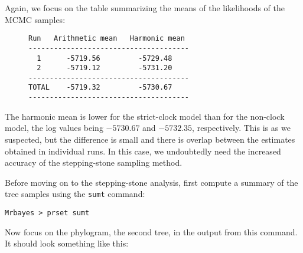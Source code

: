 \documentclass[12pt]{book}
\begin{document}
Again, we focus on the table summarizing the means of the likelihoods of the MCMC samples:

\begin{figure}[h]
\centering
\begin{BVerbatim}
Run   Arithmetic mean   Harmonic mean
--------------------------------------
  1      -5719.56         -5729.48
  2      -5719.12         -5731.20
--------------------------------------
TOTAL    -5719.32         -5730.67
--------------------------------------
\end{BVerbatim}
\end{figure}

The harmonic mean is lower for the strict-clock model than for the non-clock model, the log values
being $-5730.67$ and $-5732.35$, respectively. This is as we suspected, but the difference is small
and there is overlap between the estimates obtained in individual runs. In this case, we
undoubtedly need the increased accuracy of the stepping-stone sampling method.

Before moving on to the stepping-stone analysis, first compute a summary of the tree samples using
the \texttt{sumt} command:

\begin{Verbatim}
Mrbayes > prset sumt
\end{Verbatim}

Now focus on the phylogram, the second tree, in the output from this command. It should look
something like this:
\end{document}
